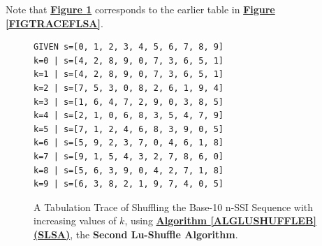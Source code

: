 \documentclass[a4paper, 18pt]{book} %
\begin{document}
\vspace{2em}
\vspace{2em}





Note that \textbf{\hyperref[FIGTRACESLSA]{Figure \ref{FIGTRACESLSA}}} corresponds to the earlier table in \textbf{\hyperref[FIGTRACEFLSA]{Figure \ref{FIGTRACEFLSA}}}.

\begin{figure}[H]
  \begin{center}
\LARGE
\begin{verbatim}
GIVEN s=[0, 1, 2, 3, 4, 5, 6, 7, 8, 9]
k=0 | s=[4, 2, 8, 9, 0, 7, 3, 6, 5, 1]
k=1 | s=[4, 2, 8, 9, 0, 7, 3, 6, 5, 1]
k=2 | s=[7, 5, 3, 0, 8, 2, 6, 1, 9, 4]
k=3 | s=[1, 6, 4, 7, 2, 9, 0, 3, 8, 5]
k=4 | s=[2, 1, 0, 6, 8, 3, 5, 4, 7, 9]
k=5 | s=[7, 1, 2, 4, 6, 8, 3, 9, 0, 5]
k=6 | s=[5, 9, 2, 3, 7, 0, 4, 6, 1, 8]
k=7 | s=[9, 1, 5, 4, 3, 2, 7, 8, 6, 0]
k=8 | s=[5, 6, 3, 9, 0, 4, 2, 7, 1, 8]
k=9 | s=[6, 3, 8, 2, 1, 9, 7, 4, 0, 5]
\end{verbatim}

   \caption{A Tabulation Trace of Shuffling the Base-10 n-SSI Sequence with increasing values of $k$, using \textbf{\hyperref[ALGLUSHUFFLEB]{Algorithm \ref{ALGLUSHUFFLEB} (SLSA)}}, the \textbf{Second Lu-Shuffle Algorithm}.}
  \label{FIGTRACESLSA}
  \end{center}
\end{figure}
\end{document}
